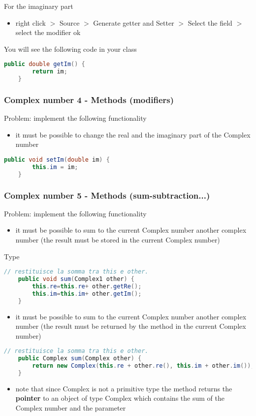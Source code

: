 \documentclass{article}
\begin{document}
For the imaginary part 
\begin{itemize}
\item right click $>$ Source $>$ Generate getter and Setter $>$ Select the field $>$ select the modifier ok
\end{itemize}
You will see the following code in your class
\begin{lstlisting}[language=Java,escapechar=|]
	public double getIm() {
		return im;
	}
\end{lstlisting}

\subsubsection{Complex number 4 - Methods (modifiers)}
Problem: implement the following functionality
\begin{itemize}
\item it must be possible to change the real and the imaginary part of the Complex number
\end{itemize}
\begin{lstlisting}[language=Java,escapechar=|]
	public void setIm(double im) {
		this.im = im;
	}
\end{lstlisting}

\subsubsection{Complex number 5 - Methods (sum-subtraction...)}
Problem: implement the following functionality
\begin{itemize}
\item it must be possible to sum to the current  Complex number another complex number (the result must be stored in the current Complex number)
\end{itemize}
Type
\begin{lstlisting}[language=Java,escapechar=|]
	// restituisce la somma tra this e other.
	public void sum(Complex1 other) {
		this.re=this.re+ other.getRe();
		this.im=this.im+ other.getIm();
	}
\end{lstlisting}
\begin{itemize}
\item it must be possible to sum to the current  Complex number another complex number (the result must be returned by the method in the current Complex number)
\end{itemize}

\begin{lstlisting}[language=Java,escapechar=|]
		// restituisce la somma tra this e other.
	public Complex sum(Complex other) {
		return new Complex(this.re + other.re(), this.im + other.im());
	}
\end{lstlisting}
\begin{itemize}
\item  note that since Complex is not a primitive type the method returns the \textbf{pointer} to an object of type Complex which contains
the sum of the Complex number and the parameter
\end{itemize}
\end{document}
